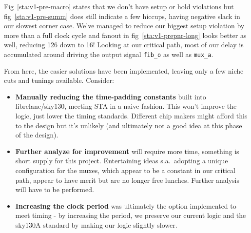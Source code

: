 \documentclass[a4paper]{report}
\begin{document}
					

					

					Fig~\ref{sta:v1-pre-macro} states that we don't have setup 
					or hold violations but fig~\ref{sta:v1-pre-summ} does still
					indicate a few hiccups, having negative slack in our 
					slowest corner case. We've managed to reduce our biggest 
					setup violation by more than a full clock cycle and 
					fanout in fig~\ref{sta:v1-prepnr-long} looks better 
					as well, reducing 126 down to 16! Looking at our critical 
					path, most of our delay is accumulated around driving 
					the output signal \verb|fib_o| as well as \verb|mux_a|. 

					\newpage
					

					From here, the easier solutions have been implemented, 
					leaving only a few niche cuts and tunings available. 
					Consider:
					\begin{itemize}
						\item \textbf{Manually reducing the time-padding constants}
							built into librelane/sky130, meeting STA in a naive 
							fashion. This won't improve the logic, just lower
							the timing standards. Different chip makers might
							afford this to the design but it's unlikely 
							(and ultimately not a good idea at this phase 
							of the design). 

						\item \textbf{Further analyze for improvement} will 
							require more time, something is short supply 
							for this project. Entertaining ideas s.a.\ adopting a unique 
							configuration for the muxes, which appear to be
							a constant in our critical path, appear to have 
							merit but are no longer free lunches. Further 
							analysis will have to be performed. 

						\item \textbf{Increasing the clock period} was ultimately
							the option implemented to meet timing - by increasing the period, 
							we preserve our current logic and the sky130A standard
							by making our logic slightly slower.
					\end{itemize}
\end{document}
